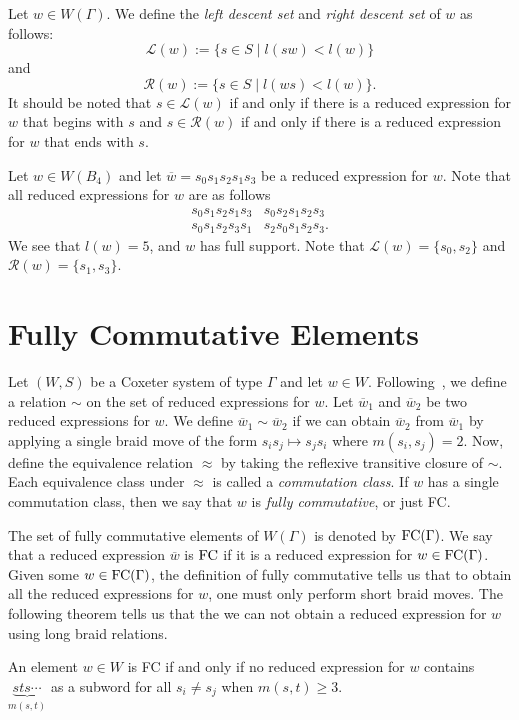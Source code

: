 Let $w \in W(\Gamma)$. We define the \emph{left descent set} and \emph{right descent set} of $w$ as follows:
\[\mathcal{L}(w):=\{s \in S \mid l(sw) < l(w)\}\]
and
\[\mathcal{R}(w):=\{s \in S \mid l(ws) < l(w)\}.\]
It should be noted that $s \in \mathcal{L}(w)$ if and only if there is a reduced expression for $w$ that begins with $s$ and $s \in \mathcal{R}(w)$ if and only if there is a reduced expression for $w$ that ends with $s$.

\begin{example}
Let $w \in W(B_4)$ and let $\overline{w}=s_0s_1s_2s_1s_3$ be a reduced expression for $w$. Note that all reduced expressions for $w$ are as follows 
$$\begin{array}{ll}
s_0s_1s_2s_1s_3 & s_0s_2s_1s_2s_3\\
s_0s_1s_2s_3s_1 & s_2s_0s_1s_2s_3.	
\end{array}$$
We see that $l(w)=5$, and $w$ has full support. Note that $\mathcal{L}(w)=\{s_0, s_2\}$ and $\mathcal{R}(w)=\{s_1, s_3\}$.	
\end{example}




\section{Fully Commutative Elements}\label{sec:FC}
Let $(W,S)$ be a Coxeter system of type $\Gamma$ and let $w \in W$. Following~\cite{Stembridge1996}, we define a relation $\sim$ on the set of reduced expressions for $w$. Let $\overline{w}_1$ and $\overline{w}_2$ be two reduced expressions for $w$. We define $\overline{w}_1 \sim \overline{w}_2$ if we can obtain $\overline{w}_2$ from $\overline{w}_1$ by applying a single braid move of the form $s_is_j \mapsto s_js_i$ where $m(s_i,s_j)=2$. Now, define the equivalence relation $\approx$ by taking the reflexive transitive closure of $\sim$. Each equivalence class under $\approx$ is called a \emph{commutation class}. If $w$ has a single commutation class, then we say that $w$ is \emph{fully commutative}, or just FC. 

The set of fully commutative elements of $W(\Gamma)$ is denoted by $\mathrm{FC}(\Gamma)$. We say that a reduced expression $\overline{w}$ is $\mathrm{FC}$ if it is a reduced expression for $w \in \mathrm{FC}(\Gamma)$. Given some $w \in \mathrm{FC}(\Gamma)$, the definition of fully commutative tells us that to obtain all the reduced expressions for $w$, one must only perform short braid moves. The following theorem tells us that the we can not obtain a reduced expression for $w$ using long braid relations.

\begin{theorem}
	An element $w \in W$ is FC if and only if no reduced expression for $w$ contains $\underbrace{sts\cdots}_{m(s,t)}$ as a subword for all $s_i \neq s_j$ when $m(s,t) \geq 3$.
\end{theorem}

